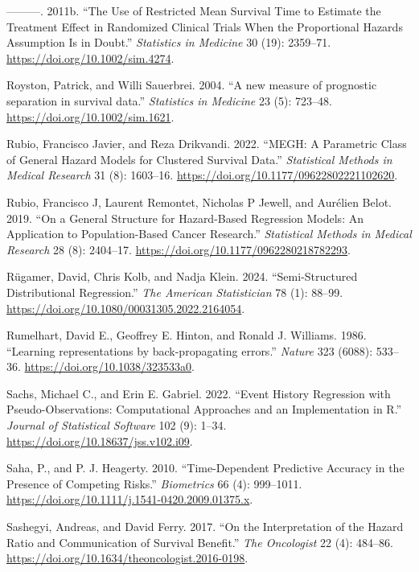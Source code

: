 \documentclass[
  letterpaper,
  krantz2]{style/krantz}
\newlength{\cslhangindent}
\newenvironment{CSLReferences}[2] %
 {\begin{list}{}{%
  \setlength{\itemindent}{0pt}
  \setlength{\leftmargin}{0pt}
  \setlength{\parsep}{0pt}
  \ifodd #1
   \setlength{\leftmargin}{\cslhangindent}
   \setlength{\itemindent}{-1\cslhangindent}
  \fi
  \setlength{\itemsep}{#2\baselineskip}}}
 {\end{list}}
\begin{document}
\begin{CSLReferences}{1}{0}
---------. 2011b. {``The Use of Restricted Mean Survival Time to
Estimate the Treatment Effect in Randomized Clinical Trials When the
Proportional Hazards Assumption Is in Doubt.''} \emph{Statistics in
Medicine} 30 (19): 2359--71. \url{https://doi.org/10.1002/sim.4274}.

Royston, Patrick, and Willi Sauerbrei. 2004. {``{A new measure of
prognostic separation in survival data}.''} \emph{Statistics in
Medicine} 23 (5): 723--48. \url{https://doi.org/10.1002/sim.1621}.

Rubio, Francisco Javier, and Reza Drikvandi. 2022. {``MEGH: A Parametric
Class of General Hazard Models for Clustered Survival Data.''}
\emph{Statistical Methods in Medical Research} 31 (8): 1603--16.
\url{https://doi.org/10.1177/09622802221102620}.

Rubio, Francisco J, Laurent Remontet, Nicholas P Jewell, and Aurélien
Belot. 2019. {``On a General Structure for Hazard-Based Regression
Models: An Application to Population-Based Cancer Research.''}
\emph{Statistical Methods in Medical Research} 28 (8): 2404--17.
\url{https://doi.org/10.1177/0962280218782293}.

Rügamer, David, Chris Kolb, and Nadja Klein. 2024. {``{Semi-Structured
Distributional Regression}.''} \emph{The American Statistician} 78 (1):
88--99. \url{https://doi.org/10.1080/00031305.2022.2164054}.

Rumelhart, David E., Geoffrey E. Hinton, and Ronald J. Williams. 1986.
{``{Learning representations by back-propagating errors}.''}
\emph{Nature} 323 (6088): 533--36.
\url{https://doi.org/10.1038/323533a0}.

Sachs, Michael C., and Erin E. Gabriel. 2022. {``Event History
Regression with Pseudo-Observations: Computational Approaches and an
Implementation in {R}.''} \emph{Journal of Statistical Software} 102
(9): 1--34. \url{https://doi.org/10.18637/jss.v102.i09}.

Saha, P., and P. J. Heagerty. 2010. {``Time-Dependent Predictive
Accuracy in the Presence of Competing Risks.''} \emph{Biometrics} 66
(4): 999--1011. \url{https://doi.org/10.1111/j.1541-0420.2009.01375.x}.

Sashegyi, Andreas, and David Ferry. 2017. {``{On the Interpretation of
the Hazard Ratio and Communication of Survival Benefit}.''} \emph{The
Oncologist} 22 (4): 484--86.
\url{https://doi.org/10.1634/theoncologist.2016-0198}.


\end{CSLReferences}
\end{document}
